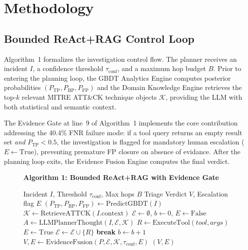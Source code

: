 \section{Methodology}
\label{sec:method}

\subsection{Bounded ReAct+RAG Control Loop}

Algorithm~1 formalizes the investigation control flow. The planner receives an
incident $I$, a confidence threshold $\tau_{\text{conf}}$, and a maximum hop
budget $B$. Prior to entering the planning loop, the GBDT Analytics Engine
computes posterior probabilities $(P_{\text{TP}}, P_{\text{BP}}, P_{\text{FP}})$
and the Domain Knowledge Engine retrieves the top-$k$ relevant MITRE ATT\&CK
technique objects $\mathcal{K}$, providing the LLM with both statistical and
semantic context.

The Evidence Gate at line~9 of Algorithm~1 implements the core contribution
addressing the 40.4\% FNR failure mode: if a tool query returns an empty result
set \emph{and} $P_{\text{TP}} < 0.5$, the investigation is flagged for mandatory
human escalation ($E \leftarrow \text{True}$), preventing premature FP closure
on absence of evidance. After the planning loop exits, the Evidence Fusion Engine
computes the final verdict.

\begin{figure}[!h]
\begin{minipage}{\columnwidth}
\hrulefill\par
\vspace{2pt}
\textbf{Algorithm 1: Bounded ReAct+RAG with Evidence Gate}\par
\vspace{2pt}
\hrulefill\par
\vspace{4pt}
\small
\begin{algorithmic}[1]
\REQUIRE Incident $I$, Threshold $\tau_{\text{conf}}$, Max hops $B$
\ENSURE Triage Verdict $V$, Escalation flag $E$
\STATE $(P_{\text{TP}}, P_{\text{BP}}, P_{\text{FP}}) \leftarrow \text{PredictGBDT}(I)$
\STATE $\mathcal{K} \leftarrow \text{RetrieveATTCK}(I.\text{context})$
\STATE $\mathcal{E} \leftarrow \emptyset$, $b \leftarrow 0$, $E \leftarrow \text{False}$
    \STATE $A \leftarrow \text{LLMPlannerThought}(I, \mathcal{E}, \mathcal{K})$
        \STATE $R \leftarrow \text{ExecuteTool}(tool, args)$
            \STATE $E \leftarrow \text{True}$ 
        \ENDIF
        \STATE $\mathcal{E} \leftarrow \mathcal{E} \cup \{R\}$
        \STATE \textbf{break}
    \ENDIF
    \STATE $b \leftarrow b + 1$
\ENDWHILE
\STATE $V, E \leftarrow \text{EvidenceFusion}(P, \mathcal{E}, \mathcal{K}, \tau_{\text{conf}}, E)$
\RETURN $(V, E)$
\end{algorithmic}
\vspace{2pt}
\hrulefill
\end{minipage}
\end{figure}

